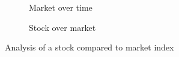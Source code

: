 \begin{figure}[h]
  \centering
  \begin{subfigure}[t]{0.45\textwidth}
    
    \caption{Market over time}
    \label{fig:stock:it:market-over-time}
  \end{subfigure}
  \quad
  \begin{subfigure}[t]{0.45\textwidth}
    
    \caption{Stock over market}
    \label{fig:stock:it:stock-over-market}
  \end{subfigure}

  \caption{Analysis of a stock compared to market index}
  \label{fig:stock:it}
\end{figure}

